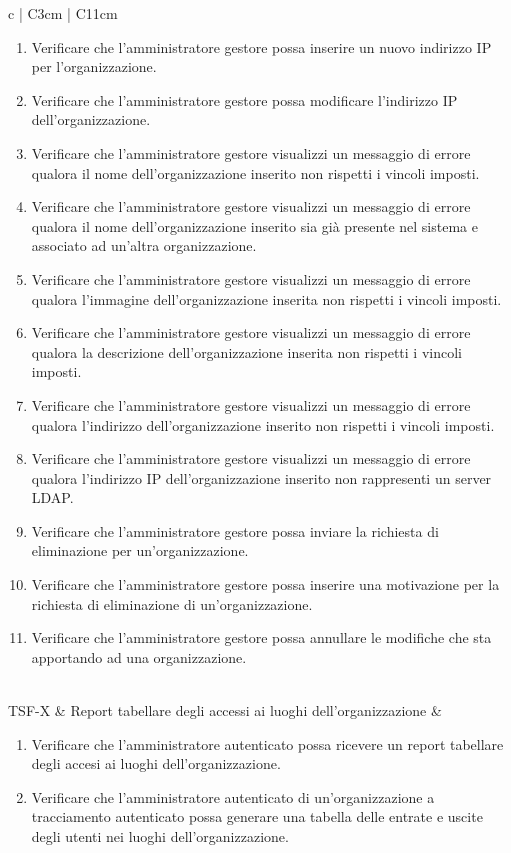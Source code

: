 {\begin{longtable}{ c | C{3cm} | C{11cm} }
\begin{enumerate}
\item Verificare che l'amministratore gestore possa inserire un nuovo indirizzo IP per l'organizzazione.
\item Verificare che l'amministratore gestore possa modificare l'indirizzo IP dell'organizzazione.
\item Verificare che l'amministratore gestore visualizzi un messaggio di errore qualora il nome dell'organizzazione inserito non rispetti i vincoli imposti.
\item Verificare che l'amministratore gestore visualizzi un messaggio di errore qualora il nome dell'organizzazione inserito sia già presente nel sistema e associato ad un'altra organizzazione.
\item Verificare che l'amministratore gestore visualizzi un messaggio di errore qualora l'immagine dell'organizzazione inserita non rispetti i vincoli imposti.
\item Verificare che l'amministratore gestore visualizzi un messaggio di errore qualora la descrizione dell'organizzazione inserita non rispetti i vincoli imposti.
\item Verificare che l'amministratore gestore visualizzi un messaggio di errore qualora l'indirizzo dell'organizzazione inserito non rispetti i vincoli imposti.
\item Verificare che l'amministratore gestore visualizzi un messaggio di errore qualora l'indirizzo IP dell'organizzazione inserito non rappresenti un server LDAP.
\item Verificare che l'amministratore gestore possa inviare la richiesta di eliminazione per un'organizzazione.
\item Verificare che l'amministratore gestore possa inserire una motivazione per la richiesta di eliminazione di un'organizzazione.
\item Verificare che l'amministratore gestore possa annullare le modifiche che sta apportando ad una organizzazione.
\end{enumerate} \\
TSF-X & Report tabellare degli accessi ai luoghi dell'organizzazione  & \begin{enumerate}
\item Verificare che l'amministratore autenticato possa ricevere un report tabellare degli accesi ai luoghi dell'organizzazione.
\item Verificare che l'amministratore autenticato di un'organizzazione a tracciamento autenticato possa generare una tabella delle entrate e uscite degli utenti nei luoghi dell'organizzazione.

\end{enumerate}
\end{longtable}}
